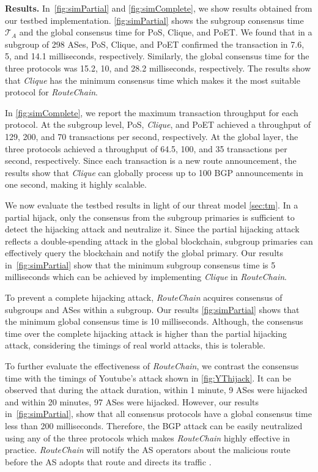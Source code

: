 \documentclass[5p]{elsarticle}
\newcommand{\BfPara}[1]{{\noindent\bf#1.}\xspace}
\newcommand{\rc}{{{\em RouteChain}}\xspace}
\begin{document}
{\BfPara{Results} In~\autoref{fig:simPartial} and \autoref{fig:simComplete}, we show results obtained from our testbed implementation. \autoref{fig:simPartial} shows the subgroup consensus time $\mathcal{T}_{A}$ and the global consensus time for PoS, Clique, and PoET. We found that in a subgroup of 298 ASes, PoS, Clique, and PoET confirmed the transaction in 7.6, 5, and 14.1 milliseconds, respectively. Similarly, the global consensus time for the three protocols was 15.2, 10, and 28.2 milliseconds, respectively. The results show that {\em Clique} has the minimum consensus time which makes it the most suitable protocol for \rc. 

In \autoref{fig:simComplete}, we report the maximum transaction throughput for each protocol. At the subgroup level, PoS, {\em Clique}, and PoET achieved a throughput of 129, 200, and 70 transactions per second, respectively. At the global layer, the three protocols achieved a throughput of 64.5, 100, and 35 transactions per second, respectively. Since each transaction is a new route announcement, the results show that {\em Clique} can globally process up to 100 BGP announcements in one second, making it highly scalable.


}



We now evaluate the testbed results in light of our threat model \textsection\ref{sec:tm}. In a  partial hijack, only the consensus from the subgroup primaries is sufficient to detect the hijacking attack and neutralize it. Since the partial hijacking attack reflects a double-spending attack in the global blockchain, subgroup primaries can effectively query the blockchain and notify the global primary. Our results in~\autoref{fig:simPartial} show that the minimum subgroup consensus time is 5 milliseconds which can be achieved by implementing {\em Clique} in \rc. 

To prevent a complete hijacking attack, \rc acquires consensus of subgroups and ASes within a subgroup. Our results \autoref{fig:simPartial} shows that the minimum global consensus time is 10 milliseconds. Although, the consensus time over the complete hijacking attack is higher than the partial hijacking attack, considering the timings of real world attacks, this is tolerable. 


{\color{blue}
To further evaluate the effectiveness of \rc, we contrast the consensus time with the timings of Youtube's attack shown in \autoref{fig:YThijack}. It can be observed that during the attack duration, within 1 minute, 9 ASes were hijacked and within 20 minutes, 97 ASes were hijacked. However, our results in~\autoref{fig:simPartial}, show that all consensus protocols have a global consensus time less than 200 milliseconds. Therefore, the BGP attack can be easily neutralized using any of the three protocols which makes \rc highly effective in practice. \rc will notify the AS operators about the malicious route before the AS adopts that route and directs its traffic .} 
\end{document}

